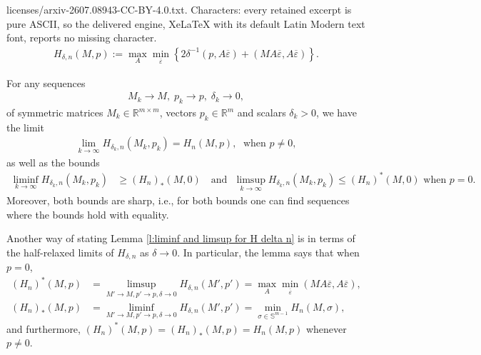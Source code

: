 \documentclass[10pt,a4paper]{amsart}
\newcommand{\R}{\mathbb R}
\newenvironment{remark}{\begin{preremark}\rm}{\medskip \end{preremark}}
\begin{document}
licenses/arxiv-2607.08943-CC-BY-4.0.txt. Characters: every retained excerpt is pure ASCII, so the delivered engine, XeLaTeX with its default Latin Modern text font, reports no missing character.
\begin{align}\label{e:definition of the auxiliary operator H delta n}
  H_{\delta,n}(M,p) := \max_A\min_{\overline\varepsilon}\left \{ 2\delta^{-1}(p,A\overline\varepsilon) + (M A\overline\varepsilon,A\overline\varepsilon) \right \}.
\end{align}

\begin{lemma}\label{l:liminf and limsup for H delta n}
For any sequences
\begin{align*}
  M_k \to M,\; p_k \to p,\; \delta_k \to 0,    \end{align*}
  of symmetric matrices $M_k \in \R^{m\times m}$, vectors $p_k \in \R^m$ and scalars $\delta_k>0$,
we have the limit
\begin{align*}
  \lim \limits_{k\to \infty} H_{\delta_k,n}(M_k,p_k) = H_n(M,p),\;\text{ when } p \neq 0,
\end{align*}
as well as the bounds
\begin{align*}
  \liminf \limits_{k\to \infty}H_{\delta_k,n}(M_k,p_k) & \geq (H_n)_*(M,0)~~~ \text { and} ~~~
  \limsup \limits_{k\to \infty}H_{\delta_k,n}(M_k,p_k)  \leq (H_n)^*(M,0) \text{ when } p=0.
\end{align*}
Moreover, both bounds are sharp, i.e., for both bounds one can find sequences where the bounds hold with equality.

\end{lemma}

\begin{remark}\label{r:half relaxed limits H n delta}
  Another way of stating Lemma \ref{l:liminf and limsup for H delta n} is in terms of the half-relaxed limits of $H_{\delta,n}$ as $\delta \to 0$. In particular, the lemma says that when $p =0$,
  \begin{align*}
    (H_n)^*(M,p) & = \limsup_{M'\to M, p'\to p,\delta \to 0} H_{\delta,n}(M',p') = \max_A \min_{\overline \varepsilon}(MA\overline\varepsilon,A\overline\varepsilon),\\
    (H_n)_*(M,p) & = \liminf_{M'\to M, p'\to p,\delta \to 0} H_{\delta,n}(M',p') = \min_{\sigma \in \mathbb{S}^{m-1}} H_n(M,\sigma), 
  \end{align*}
  and furthermore, $(H_n)^*(M,p) = (H_n)_*(M,p) = H_n(M,p)$ whenever $p \neq 0$. 

\end{remark}
\end{document}
